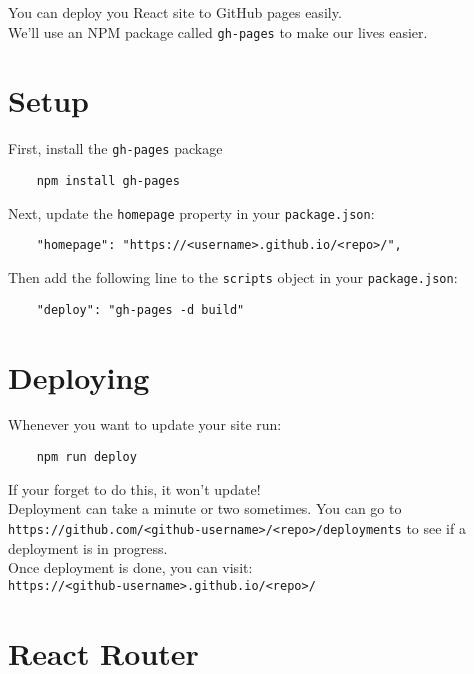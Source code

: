 You can deploy you React site to GitHub pages easily.
\\

We'll use an NPM package called \texttt{gh-pages} to make our lives easier.

\section{Setup}

First, install the \texttt{gh-pages} package

\begin{verbatim}
    npm install gh-pages
\end{verbatim}

Next, update the \texttt{homepage} property in your \texttt{package.json}:

\begin{verbatim}
    "homepage": "https://<username>.github.io/<repo>/",
\end{verbatim}

Then add the following line to the \texttt{scripts} object in your \texttt{package.json}:

\begin{verbatim}
    "deploy": "gh-pages -d build"
\end{verbatim}


\pagebreak


\section{Deploying}

Whenever you want to update your site run:

\begin{verbatim}
    npm run deploy
\end{verbatim}

If your forget to do this, it won't update!
\\

Deployment can take a minute or two sometimes. You can go to \\ \texttt{https://github.com/<github-username>/<repo>/deployments} to see if a deployment is in progress.
\\

Once deployment is done, you can visit:\\ \texttt{https://<github-username>.github.io/<repo>/}


\section{React Router}


